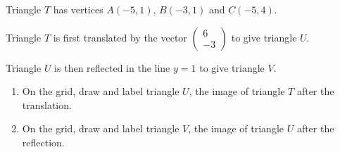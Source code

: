 \begin{question}
\noindent Triangle $T$ has vertices $A(-5,1)$, $B(-3,1)$ and $C(-5,4)$.

\noindent Triangle $T$ is first translated by the vector $\begin{pmatrix} 6 \\ -3 \end{pmatrix}$ to give triangle $U$.

\noindent Triangle $U$ is then reflected in the line $y = 1$ to give triangle $V$.

\begin{center}
\end{center}

\begin{enumerate}
    \item[(a)] On the grid, draw and label triangle $U$, the image of triangle $T$ after the translation.

    \vspace{5cm}

    \item[(b)] On the grid, draw and label triangle $V$, the image of triangle $U$ after the reflection.

    \vspace{5cm}
\end{enumerate}
\end{question}
